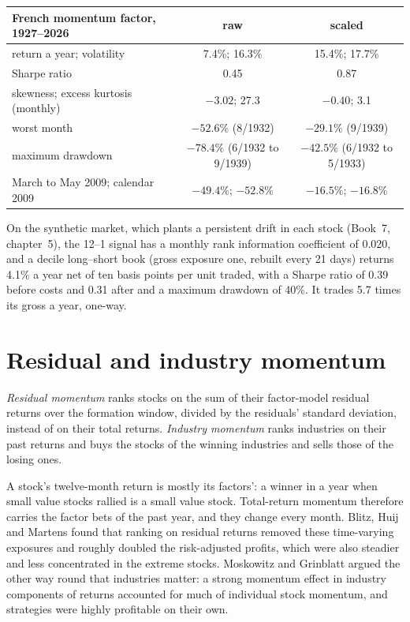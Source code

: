 \begin{center}
\small
\begin{tabular}{@{}lcc@{}}
\toprule
French momentum factor, 1927--2026 & raw & scaled\\
\midrule
return a year; volatility & 7.4\%; 16.3\% & 15.4\%; 17.7\%\\
Sharpe ratio & 0.45 & 0.87\\
skewness; excess kurtosis (monthly) & $-3.02$; 27.3 & $-0.40$; 3.1\\
worst month & $-52.6\%$ (8/1932) & $-29.1\%$ (9/1939)\\
maximum drawdown & $-78.4\%$ (6/1932 to 9/1939) & $-42.5\%$ (6/1932 to 5/1933)\\
March to May 2009; calendar 2009 & $-49.4\%$; $-52.8\%$ & $-16.5\%$; $-16.8\%$\\
\bottomrule
\end{tabular}
\end{center}

On the synthetic market, which plants a persistent drift in each stock (Book~7, chapter~5), the 12--1 signal has a monthly rank information coefficient of
0.020, and a decile long--short book (gross exposure one, rebuilt every 21 days) returns 4.1\% a year net of ten basis points per unit traded, with a Sharpe
ratio of 0.39 before costs and 0.31 after and a maximum drawdown of 40\%. It trades 5.7 times its gross a year, one-way.

\section{Residual and industry momentum}

\begin{definition}\label{def:s1:momentum:residual}
\emph{Residual momentum} ranks stocks on the sum of their factor-model residual returns over the formation window, divided by the
residuals' standard deviation, instead of on their total returns. \emph{Industry momentum} ranks industries on their past returns
and buys the stocks of the winning industries and sells those of the losing ones.
\end{definition}

A stock's twelve-month return is mostly its factors': a winner in a year when small value stocks rallied is a small value stock. Total-return momentum
therefore carries the factor bets of the past year, and they change every month. Blitz, Huij and Martens found that ranking on residual returns removed these
time-varying exposures and roughly doubled the risk-adjusted profits, which were also steadier and less concentrated in the extreme stocks. Moskowitz and
Grinblatt argued the other way round that industries matter: a strong momentum effect in industry components of returns accounted for much of individual
stock momentum, and  strategies were highly profitable on their own.

